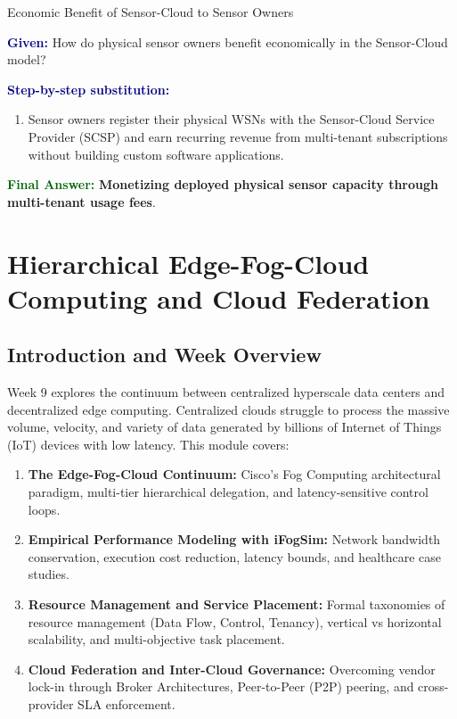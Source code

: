 \documentclass[11pt,a4paper,openany]{report}
\newcommand{\Given}{\par\textbf{\textcolor{navy}{Given:}} }
\newcommand{\Steps}{\par\textbf{\textcolor{navy}{Step-by-step substitution:}}\par}
\newcommand{\Answer}{\par\textbf{\textcolor{darkgreen}{Final Answer:}} }
\begin{document}
\begin{solved}{Economic Benefit of Sensor-Cloud to Sensor Owners}
\Given How do physical sensor owners benefit economically in the Sensor-Cloud model?
\Steps
\begin{enumerate}[leftmargin=*]
  \item Sensor owners register their physical WSNs with the Sensor-Cloud Service Provider (SCSP) and earn recurring revenue from multi-tenant subscriptions without building custom software applications.
\end{enumerate}
\Answer \textbf{Monetizing deployed physical sensor capacity through multi-tenant usage fees}.
\end{solved}

\chapter{Hierarchical Edge-Fog-Cloud Computing and Cloud Federation}

\section{Introduction and Week Overview}
Week 9 explores the continuum between centralized hyperscale data centers and decentralized edge computing. Centralized clouds struggle to process the massive volume, velocity, and variety of data generated by billions of Internet of Things (IoT) devices with low latency. This module covers:
\begin{enumerate}[leftmargin=*]
  \item \textbf{The Edge-Fog-Cloud Continuum:} Cisco's Fog Computing architectural paradigm, multi-tier hierarchical delegation, and latency-sensitive control loops.
  \item \textbf{Empirical Performance Modeling with iFogSim:} Network bandwidth conservation, execution cost reduction, latency bounds, and healthcare case studies.
  \item \textbf{Resource Management and Service Placement:} Formal taxonomies of resource management (Data Flow, Control, Tenancy), vertical vs horizontal scalability, and multi-objective task placement.
  \item \textbf{Cloud Federation and Inter-Cloud Governance:} Overcoming vendor lock-in through Broker Architectures, Peer-to-Peer (P2P) peering, and cross-provider SLA enforcement.
\end{enumerate}
\end{document}
